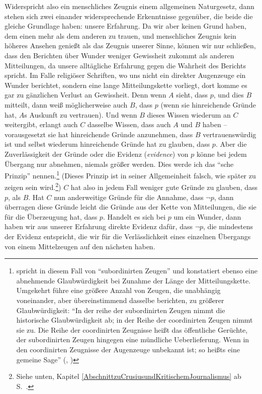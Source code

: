 Widerspricht also ein menschliches Zeugnis einem allgemeinen Naturgesetz, dann
stehen sich zwei einander widersprechende Erkenntnisse gegenüber, die beide
die gleiche Grundlage haben: unsere Erfahrung. Da wir aber keinen Grund haben,
dem einen mehr als dem anderen zu trauen, und menschliches Zeugnis kein höheres
Ansehen genießt als das Zeugnis unserer Sinne, können wir nur schließen, dass
den Berichten über Wunder weniger Gewissheit zukommt als anderen Mitteilungen,
da unsere alltägliche Erfahrung gegen die Wahrheit des Berichts spricht. Im
Falle religiöser Schriften, wo uns nicht ein direkter Augenzeuge ein Wunder
berichtet, sondern eine lange Mitteilungskette vorliegt, dort komme es gar zu
gänzlichen Verlust an Gewissheit. Denn wenn $A$ sieht, dass $p$, und dies $B$
mitteilt, dann weiß möglicherweise auch $B$, dass $p$ (wenn sie hinreichende
Gründe hat, $A$s Auskunft zu vertrauen). Und wenn $B$ dieses Wissen wiederum an
$C$ weitergibt, erlangt auch $C$ dasselbe Wissen, dass auch $A$ und $B$ haben --
vorausgesetzt sie hat hinreichende Gründe anzunehmen, dass $B$ vertrauenswürdig
ist und selbst wiederum hinreichende Gründe hat zu glauben, dass $p$. Aber die
Zuverlässigkeit der Gründe oder die Evidenz (\emph{evidence}) von $p$ könne bei
jedem Übergang nur abnehmen, niemals größer werden. Dies werde ich das
\enquote{\label{DasHumeschePrinzip}sche Prinzip}
nennen.\footnote{ spricht in diesem Fall von
\enquote{subordinirten Zeugen} und konstatiert ebenso eine abnehmende
Glaubwürdigkeit bei Zunahme der Länge der Mitteilungskette. Umgekehrt führe eine
größere Anzahl von Zeugen, die unabhängig voneinander, aber übereinstimmend
dasselbe berichten, zu größerer Glaubwürdigkeit: \enquote{In der reihe der
subordinirten Zeugen nimmt die historische Glaubwürdigkeit ab; in der Reihe der
coordinirten Zeugen nimmt sie zu. Die Reihe der coordinirten Zeugnisse heißt das
öffentliche Gerüchte, der subordinirten Zeugen hingegen eine mündliche
Ueberlieferung. Wenn in den coordinirten Zeugnisse der Augenzeuge unbekannt ist;
so heißts eine gemeine Sage}
\mkbibparens{\cite[][]{Kant:LogikPhilippi1966}, \cite[][XXIV:
450.23--28]{Kant:GesammelteWerke1900ff.}}} (Dieses Prinzip ist in seiner Allgemeinheit
falsch, wie später zu zeigen sein wird.\footnote{Siehe unten, Kapitel
\ref{AbschnittzuCrusiusundKritischemJournalismus} ab
S.~\pageref{AbschnittzuCrusiusundKritischemJournalismus}.}) $C$ hat also in
jedem Fall weniger gute Gründe zu glauben, dass $p$, als $B$. Hat $C$ nun
anderweitige Gründe für die Annahme, dass $\lnot p$, dann überragen diese Gründe
leicht die Gründe aus der Kette von Mitteilungen, die sie für die Überzeugung
hat, dass $p$. Handelt es sich bei $p$ um ein Wunder, dann haben wir aus unserer
Erfahrung direkte Evidenz dafür, dass $\lnot p$, die mindestens der Evidenz
entspricht, die wir für die Verlässlichkeit eines einzelnen Übergangs von einem
Mittelzeugen auf den nächsten haben.



